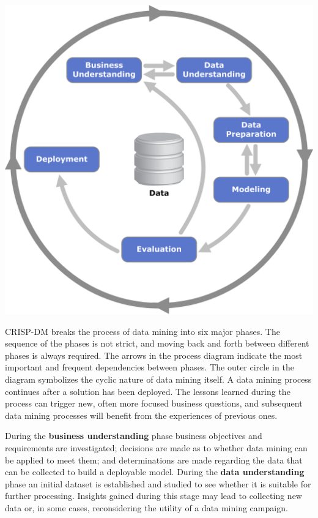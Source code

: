 \documentclass[10pt, letter]{report}
\renewcommand{\=}{\, =\, }
\newcommand{\+}{\, +\, }
\renewcommand{\-}{\, -\, }
\begin{document}
\begin{center}
\includegraphics[scale=0.35]{CRISP-DM_Process_Diagram.png}
\end{center}

CRISP-DM breaks the process of data mining into six major phases. The sequence of the phases is not strict, and moving back and forth between different phases is always required. The arrows in the process diagram indicate the most important and frequent dependencies between phases. The outer circle in the diagram symbolizes the cyclic nature of data mining itself. A data mining process continues after a solution has been deployed. The lessons learned during the process can trigger new, often more focused business questions, and subsequent data mining processes will benefit from the experiences of previous ones.

During the \textbf{business understanding} phase business objectives and requirements are investigated; decisions are made as to whether data mining can be applied to meet them; and determinations are made regarding the data that can be collected to build a deployable model. During the \textbf{data understanding} phase an initial dataset is established and studied to see whether it is suitable for further processing. Insights gained during this stage may lead to collecting new data or, in some cases, reconsidering the utility of a data mining campaign.
\end{document}
